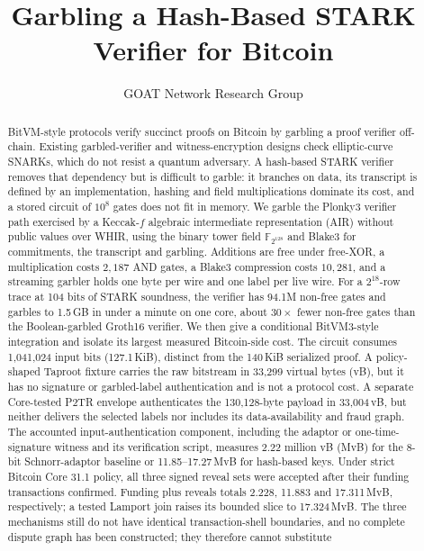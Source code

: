 \documentclass[11pt]{article}
\title{Garbling a Hash-Based STARK Verifier for Bitcoin}
\author{GOAT Network Research Group}
\date{}
\newcommand{\F}{\mathbb{F}_{2^{128}}}
\newcommand{\AND}{\textsf{AND}}
\begin{document}
\maketitle

\begin{abstract}
BitVM-style protocols verify succinct proofs on Bitcoin by garbling a proof
verifier off-chain. Existing garbled-verifier and witness-encryption designs
check elliptic-curve SNARKs, which do not resist a quantum adversary. A
hash-based STARK verifier removes that dependency but is difficult to garble:
it branches on data, its transcript is defined by an implementation, hashing
and field multiplications dominate its cost, and a stored circuit of $10^8$
gates does not fit in memory. We garble the Plonky3 verifier path exercised by
a Keccak-$f$ algebraic intermediate representation (AIR) without public values
over WHIR,
using the binary tower field $\F$ and Blake3 for commitments, the transcript and
garbling. Additions are free under free-XOR, a multiplication costs $2{,}187$
\AND{} gates, a Blake3 compression costs $10{,}281$, and a streaming garbler
holds one byte per wire and one label per live wire. For a $2^{18}$-row trace at
104 bits of STARK soundness, the verifier has 94.1M non-free gates and garbles
to 1.5\,GB in under a minute on one core, about $30\times$ fewer non-free gates
than the Boolean-garbled Groth16 verifier. We then give a conditional
BitVM3-style integration and isolate its largest measured Bitcoin-side cost.
The circuit consumes
1{,}041{,}024 input bits (127.1\,KiB), distinct from the 140\,KiB serialized
proof. A policy-shaped Taproot fixture carries the raw bitstream in
33{,}299 virtual bytes (vB), but it has no signature or garbled-label
authentication and is not a protocol cost. A separate Core-tested P2TR
envelope authenticates the 130{,}128-byte payload in 33{,}004\,vB, but neither
delivers the selected labels nor includes its data-availability and fraud
graph. The accounted input-authentication component, including the adaptor or
one-time-signature witness and its verification script, measures 2.22 million
vB (MvB) for the 8-bit Schnorr-adaptor baseline or
11.85--17.27\,MvB for hash-based keys. Under strict Bitcoin Core 31.1 policy,
all three signed reveal sets were accepted after their funding transactions
confirmed. Funding plus reveals totals 2.228, 11.883 and 17.311\,MvB,
respectively; a tested Lamport join raises its bounded slice to 17.324\,MvB. The three
mechanisms still do not have identical transaction-shell boundaries, and no
complete dispute graph has been constructed; they therefore cannot substitute

\end{abstract}
\end{document}
